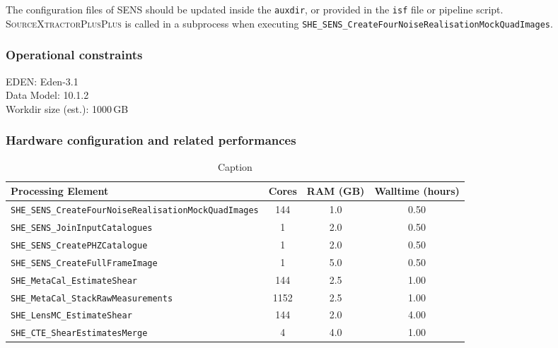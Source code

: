 \documentclass[11pt]{EuclidVIS}
\numberwithin{table}{section}
\numberwithin{figure}{section}
\begin{document}
The configuration files of \textsc{SENS} should be updated inside the \texttt{auxdir}, or provided in the \texttt{isf} file or pipeline script.
\textsc{SourceXtractorPlusPlus} is called in a subprocess when executing \texttt{SHE\_SENS\_CreateFourNoiseRealisationMockQuadImages}. 

\subsubsection{Operational constraints}

\noindent EDEN: Eden-3.1\\
\noindent Data Model: 10.1.2\\
\noindent Workdir size (est.): 1000\,GB

\subsubsection{Hardware configuration and related performances}

\begin{table}[]
    \centering
    \begin{tabular}{|l|c|c|c|}
         \hline
         Processing Element                                           & Cores & RAM (GB) & Walltime (hours) \\
         \hline
         \texttt{SHE\_SENS\_CreateFourNoiseRealisationMockQuadImages} & 144   & 1.0      & 0.50 \\
         \texttt{SHE\_SENS\_JoinInputCatalogues}                      & 1     & 2.0      & 0.50 \\
         \texttt{SHE\_SENS\_CreatePHZCatalogue}                       & 1     & 2.0      & 0.50 \\
         \texttt{SHE\_SENS\_CreateFullFrameImage}                     & 1     & 5.0      & 0.50 \\
         \texttt{SHE\_MetaCal\_EstimateShear}                         & 144   & 2.5      & 1.00 \\
         \texttt{SHE\_MetaCal\_StackRawMeasurements}                  & 1152  & 2.5      & 1.00 \\
         \texttt{SHE\_LensMC\_EstimateShear}                          & 144   & 2.0      & 4.00 \\
         \texttt{SHE\_CTE\_ShearEstimatesMerge}                       & 4     & 4.0      & 1.00 \\
         \hline
    \end{tabular}
    \caption{Caption}
    \label{tab:my_label}
\end{table}
\end{document}
